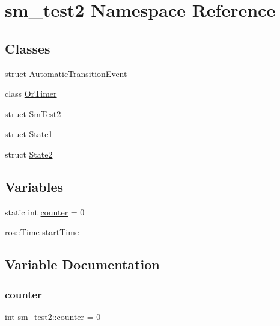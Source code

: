 \hypertarget{namespacesm__test2}{}\section{sm\+\_\+test2 Namespace Reference}
\label{namespacesm__test2}
\subsection*{Classes}
\begin{DoxyCompactItemize}
\item 
struct \hyperlink{structsm__test2_1_1AutomaticTransitionEvent}{Automatic\+Transition\+Event}
\item 
class \hyperlink{classsm__test2_1_1OrTimer}{Or\+Timer}
\item 
struct \hyperlink{structsm__test2_1_1SmTest2}{Sm\+Test2}
\item 
struct \hyperlink{structsm__test2_1_1State1}{State1}
\item 
struct \hyperlink{structsm__test2_1_1State2}{State2}
\end{DoxyCompactItemize}
\subsection*{Variables}
\begin{DoxyCompactItemize}
\item 
static int \hyperlink{namespacesm__test2_a42c85e52b584387fd269df67f8e6c732}{counter} = 0
\item 
ros\+::\+Time \hyperlink{namespacesm__test2_a0b4e1ce52146b421cf6062a0900035aa}{start\+Time}
\end{DoxyCompactItemize}


\subsection{Variable Documentation}
\mbox{\label{namespacesm__test2_a42c85e52b584387fd269df67f8e6c732}} 
\subsubsection{\texorpdfstring{counter}{counter}}
{\footnotesize\ttfamily int sm\+\_\+test2\+::counter = 0\hspace{0.3cm}{\ttfamily [static]}}



